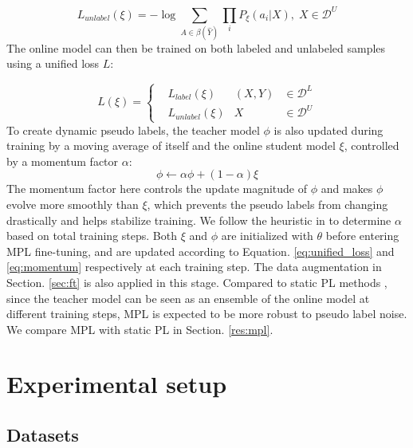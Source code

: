 \documentclass[a4paper]{article}
\begin{document}
\vspace{-3mm}
\begin{equation}
L_{unlabel}(\xi)=-\log \sum\limits_{A \in \beta(\hat{Y})} \prod\limits_{i} P_{\xi}(a_{i}|X), \; X \in \mathcal{D}^{U}
\end{equation}
The online model can then be trained on both labeled and unlabeled samples using a unified loss $L$:

\begin{equation}
    L(\xi) = \left\{\begin{aligned}
        & L_{label}(\xi)  & (X, Y) &\in \mathcal{D}^{L} \\ 
        & L_{unlabel}(\xi) &  X &\in \mathcal{D}^{U}
    \end{aligned}\right.
    \label{eq:unified_loss}
\end{equation}
To create dynamic pseudo labels, the teacher model $\phi$ is also updated during training by a moving average of itself and the online student model $\xi$, controlled by a momentum factor $\alpha$:
\begin{equation}
    \phi \leftarrow \alpha \phi + (1-\alpha) \xi
    \label{eq:momentum}
\end{equation}
The momentum factor here controls the update magnitude of $\phi$ and makes $\phi$ evolve more smoothly than $\xi$, which prevents the pseudo labels from changing drastically and helps stabilize training. We follow the heuristic in \cite{higuchi2021momentum} to determine $\alpha$ based on total training steps. Both $\xi$ and $\phi$ are initialized with $\theta$ before entering MPL fine-tuning, and are updated according to Equation. \ref{eq:unified_loss} and \ref{eq:momentum} respectively at each training step. The data augmentation in Section. \ref{sec:ft} is also applied in this stage. Compared to static PL methods \cite{kahn2020self, park20d_interspeech}, since the teacher model can be seen as an ensemble of the online model at different training steps, MPL is expected to be more robust to pseudo label noise. We compare MPL with static PL in Section. \ref{res:mpl}. 




\section{Experimental setup}
\subsection{Datasets} \label{sec:data}
\end{document}
